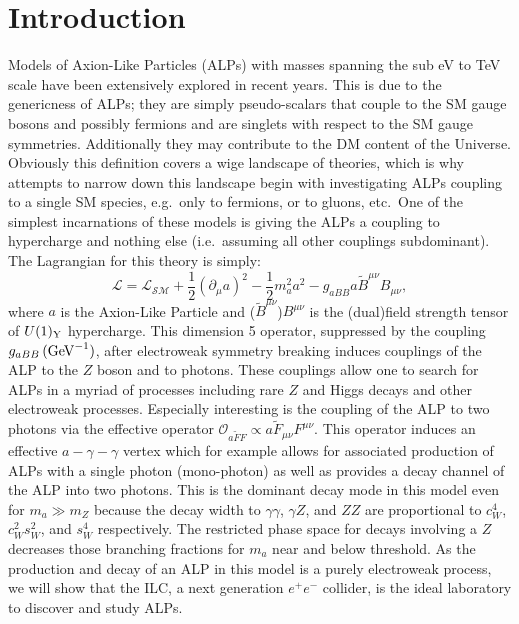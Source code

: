 \documentclass[aps,onecolumn,twoside,secnumarabic,12pt,balancelastpage,amsmath,amssymb,nofootinbib,hyperref=pdftex]{revtex4}
\begin{document}
\section {Introduction}
Models of Axion-Like Particles (ALPs) with masses spanning the sub eV to TeV scale have been extensively explored in recent years\cite{Ringwald:2014vqa}. This is due to the genericness of ALPs; they are simply pseudo-scalars that couple to the SM gauge bosons and possibly fermions and are singlets with respect to the SM gauge symmetries\cite{Beacham:2019nyx, weinberg}. Additionally they may contribute to the DM content of the Universe\cite{Duffy:2009ig}. Obviously this definition covers a wige landscape of theories, which is why attempts to narrow down this landscape begin with investigating ALPs coupling to a single SM species, e.g.\ only to fermions, or to gluons, etc.\ One of the simplest incarnations of these models is giving the ALPs a coupling to hypercharge and nothing else (i.e.\ assuming all other couplings subdominant). The Lagrangian for this theory is simply:
\begin{equation}
\mathcal{L} = \mathcal{L_{SM}} + \frac{1}{2}(\partial_{\mu}a)^{2} - \frac{1}{2}m_{a}^{2}a^{2} - g_{aBB}a\tilde{B}^{\mu\nu}B_{\mu\nu},
\end{equation}
where $a$ is the Axion-Like Particle and ($\tilde{B}^{\mu\nu}$)$B^{\mu\nu}$ is the (dual)field strength tensor of $U(1)_{\rm{Y}}$ hypercharge. 
\vskip 0.12in
This dimension 5 operator, suppressed by the coupling $g_{aBB}\,(\rm{GeV}^{-1})$, after electroweak symmetry breaking induces couplings of the ALP to the $Z$ boson and to photons. These couplings allow one to search for ALPs in a myriad of processes including rare $Z$ and Higgs decays and other electroweak processes\cite{Florez:2021zoo, Steinberg:2021iay, dEnterria:2021ljz}. Especially interesting is the coupling of the ALP to two photons via the effective operator $\mathcal{O}_{a\tilde{F}F} \propto a\tilde{F}_{\mu\nu}F^{\mu\nu}$. This operator induces an effective $a-\gamma-\gamma$ vertex which for example allows for associated production of ALPs with a single photon (mono-photon) as well as provides a decay channel of the ALP into two photons. This is the dominant decay mode in this model even for $m_{a} \gg m_{Z}$ because the decay width to $\gamma\gamma$, $\gamma Z$, and $ZZ$ are proportional to $c_{W}^{4}$, $c_{W}^{2}s_{W}^{2}$, and $s_{W}^{4}$ respectively. The restricted phase space for decays involving a $Z$ decreases those branching fractions for $m_{a}$ near and below threshold. 
	As the production and decay of an ALP in this model is a purely electroweak process, we will show that the ILC, a next generation $e^{+} e^{-}$ collider, is the ideal laboratory to discover and study ALPs. 
\vskip 0.12in
\end{document}
